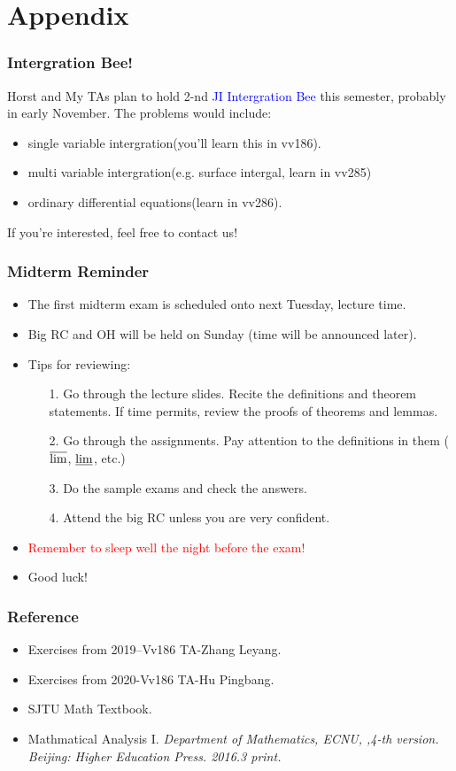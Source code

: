 \documentclass{beamer}
\newcommand{\myfont}{\rmfamily\normalsize\upshape\mdseries}
\begin{document}
\section{Appendix}
\begin{frame}
    \frametitle{Intergration Bee!}
    Horst and My TAs plan to hold 2-nd \textcolor{blue}{JI Intergration Bee} this semester, probably in early November. 
    The problems would include:
    \begin{itemize}
        \item single variable intergration(you'll learn this in vv186).
        \item multi variable intergration(e.g. surface intergal, learn in vv285)
        \item ordinary differential equations(learn in vv286).
    \end{itemize}
    \vspace{2em}
    If you're interested, feel free to contact us!
\end{frame}
\begin{frame}
    \frametitle{Midterm Reminder}
    \begin{itemize}
        \item The first midterm exam is scheduled onto next Tuesday, lecture time.
        \item Big RC and OH will be held on Sunday (time will be announced
        later).
        \item Tips for reviewing:
        \begin{itemize}
            \item[1.] Go through the lecture slides. Recite the definitions and theorem
            statements. If time permits, review the proofs of theorems and
            lemmas.
            \item[2.] Go through the assignments. Pay attention to the definitions in
            them ($\varlimsup$, $\varliminf$, etc.)
            \item[3.] Do the sample exams and check the answers.
            \item[4.] Attend the big RC unless you are very confident.        
        \end{itemize}
        \item \textcolor{red}{Remember to sleep well the night before the exam!}
        \item Good luck!
    \end{itemize}
    

\end{frame}
\begin{frame}
    \frametitle{Reference}
    \begin{itemize}
        \item Exercises from 2019–Vv186 TA-Zhang Leyang.
        \item Exercises from 2020-Vv186 TA-Hu Pingbang.
        \item SJTU Math Textbook.
        \item Mathmatical Analysis I. \itshape Department of Mathematics, ECNU,\myfont
        ,4-th version. Beijing: Higher Education Press. 2016.3 print.
    \end{itemize}

\end{frame}
\end{document}
